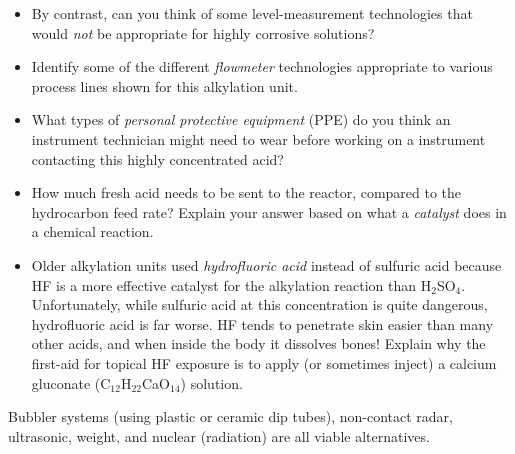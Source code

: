 \begin{itemize}
\item{} By contrast, can you think of some level-measurement technologies that would {\it not} be appropriate for highly corrosive solutions?
\item{} Identify some of the different {\it flowmeter} technologies appropriate to various process lines shown for this alkylation unit.
\item{} What types of {\it personal protective equipment} (PPE) do you think an instrument technician might need to wear before working on a instrument contacting this highly concentrated acid?
\item{} How much fresh acid needs to be sent to the reactor, compared to the hydrocarbon feed rate?  Explain your answer based on what a {\it catalyst} does in a chemical reaction.
\item{} Older alkylation units used {\it hydrofluoric acid} instead of sulfuric acid because HF is a more effective catalyst for the alkylation reaction than H$_{2}$SO$_{4}$.  Unfortunately, while sulfuric acid at this concentration is quite dangerous, hydrofluoric acid is far worse.  HF tends to penetrate skin easier than many other acids, and when inside the body it dissolves bones!  Explain why the first-aid for topical HF exposure is to apply (or sometimes inject) a calcium gluconate (C$_{12}$H$_{22}$CaO$_{14}$) solution.
\end{itemize}














Bubbler systems (using plastic or ceramic dip tubes), non-contact radar, ultrasonic, weight, and nuclear (radiation) are all viable alternatives.




